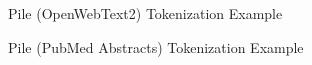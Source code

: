 \documentclass[11pt]{article}
\begin{document}
\begin{figure}[p]
    \centering
    
    \caption{Pile (OpenWebText2) Tokenization Example}
    \label{fig:tok_example_12}
\end{figure}

\begin{figure}[p]
    \centering
    
    \caption{Pile (PubMed Abstracts) Tokenization Example}
    \label{fig:tok_example_15}
\end{figure}
\end{document}
